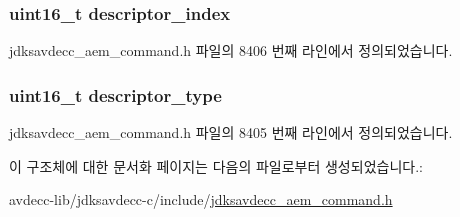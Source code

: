 \subsubsection[{\texorpdfstring{descriptor\+\_\+index}{descriptor_index}}]{\setlength{\rightskip}{0pt plus 5cm}uint16\+\_\+t descriptor\+\_\+index}\hypertarget{structjdksavdecc__aem__command__get__video__format_a042bbc76d835b82d27c1932431ee38d4}{}\label{structjdksavdecc__aem__command__get__video__format_a042bbc76d835b82d27c1932431ee38d4}


jdksavdecc\+\_\+aem\+\_\+command.\+h 파일의 8406 번째 라인에서 정의되었습니다.

\subsubsection[{\texorpdfstring{descriptor\+\_\+type}{descriptor_type}}]{\setlength{\rightskip}{0pt plus 5cm}uint16\+\_\+t descriptor\+\_\+type}\hypertarget{structjdksavdecc__aem__command__get__video__format_ab7c32b6c7131c13d4ea3b7ee2f09b78d}{}\label{structjdksavdecc__aem__command__get__video__format_ab7c32b6c7131c13d4ea3b7ee2f09b78d}


jdksavdecc\+\_\+aem\+\_\+command.\+h 파일의 8405 번째 라인에서 정의되었습니다.



이 구조체에 대한 문서화 페이지는 다음의 파일로부터 생성되었습니다.\+:\begin{DoxyCompactItemize}
\item 
avdecc-\/lib/jdksavdecc-\/c/include/\hyperlink{jdksavdecc__aem__command_8h}{jdksavdecc\+\_\+aem\+\_\+command.\+h}\end{DoxyCompactItemize}
